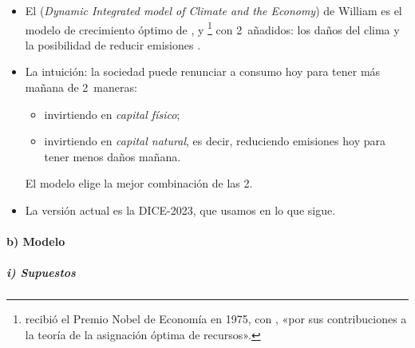 \documentclass[11pt]{article}
\begin{document}
\begin{itemize}
\item El  (\emph{Dynamic Integrated model of Climate and the Economy}) de William \textcite{Nordhaus1992Optimal} es el modelo de crecimiento óptimo de ,  y \footnote{ recibió el Premio Nobel de Economía en 1975, con , «por sus contribuciones a la teoría de la asignación óptima de recursos»\nocite{NobelPrize1975Koopmans}.} con 2~añadidos: los daños del clima y la posibilidad de reducir emisiones .
\item La intuición: la sociedad puede renunciar a consumo hoy para tener más mañana de 2~maneras:
  \begin{itemize}
  \item invirtiendo en \emph{capital físico};
  \item invirtiendo en \emph{capital natural}, es decir, reduciendo emisiones hoy para tener menos daños mañana.
  \end{itemize}
  El modelo elige la mejor combinación de las 2.
\item La versión actual es la DICE-2023\nocite{BarrageNordhaus2024DICE}, que usamos en lo que sigue.
\end{itemize}

\paragraph{b) Modelo}

\subparagraph{i) Supuestos}
\end{document}
